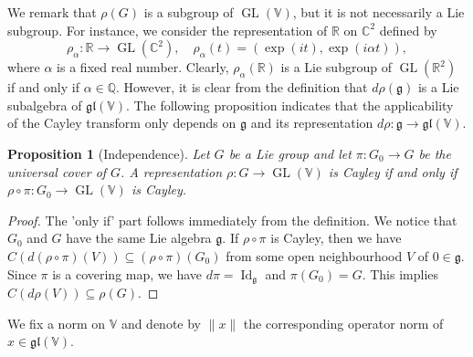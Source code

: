 \documentclass[11pt,reqno]{amsart}
\DeclareMathOperator{\GL}{GL}
\DeclareMathOperator{\Id}{Id}
\newtheorem{proposition}[theorem]{Proposition}
\newcommand{\QQ}{\mathbb{Q}} %
\begin{document}
We remark that $\rho(G)$ is a subgroup of $\GL(\mathbb{V})$,  but it is not necessarily a Lie subgroup.  For instance,  we consider the representation of $\mathbb{R}$ on $\mathbb{C}^2$ defined by 
\[
\rho_\alpha: \mathbb{R} \to \GL(\mathbb{C}^2),\quad \rho_{\alpha}(t) = (\exp(it), \exp(i \alpha t)),
\]
where $\alpha$ is a fixed real number.  Clearly,  $\rho_{\alpha}(\mathbb{R})$ is a Lie subgroup of $\GL(\mathbb{R}^2)$ if and only if $\alpha \in \QQ$.  However,  it is clear from the definition that $d\rho (\mathfrak{g})$ is a Lie subalgebra of $\mathfrak{gl}(\mathbb{V})$.  The following proposition indicates that the applicability of the Cayley transform only depends on $\mathfrak{g}$ and its representation $d\rho: \mathfrak{g} \to \mathfrak{gl}(\mathbb{V})$.  

\begin{proposition}[Independence]\label{prop: group to Lie algebra}
Let $G$ be a Lie group and let $\pi: G_0 \to G$ be the universal cover of $G$.  A representation $\rho: G\to \GL(\mathbb{V})$ is Cayley if and only if $\rho \circ \pi: G_0 \to \GL(\mathbb{V})$ is Cayley.  
\end{proposition}
\begin{proof}
The 'only if' part follows immediately from the definition.  We notice that $G_0$ and $G$ have the same Lie algebra $\mathfrak{g}$.  If $\rho \circ \pi$ is Cayley,  then we have $C ( d (\rho \circ \pi) (V) ) \subseteq (\rho \circ \pi) (G_0) $ from some open neighbourhood $V$ of $0 \in \mathfrak{g}$.  Since $\pi$ is a covering map,  we have $d\pi  = \Id_{\mathfrak{g}}$ and $\pi(G_0) = G$.  This implies $C (d \rho (V)) \subseteq \rho(G)$.
\end{proof}

We fix a norm on $\mathbb{V}$ and denote by $\lVert x \rVert$ the corresponding operator norm of $x \in \mathfrak{gl}(\mathbb{V})$.
\end{document}
